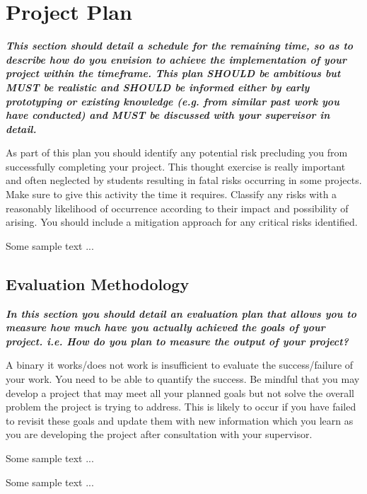 \documentclass{article} %
\newcommand{\hint}[1] {\par {\bfseries \color{Blue} \it #1 \par}}
\begin{document}
\newpage
\section{Project Plan}
\hint{This section should detail a schedule for the remaining time, so as to describe how do you envision to achieve the implementation of your project within the timeframe. This plan SHOULD be ambitious but MUST be realistic and SHOULD be informed either by early prototyping or existing knowledge (e.g. from similar past work you have conducted) and MUST be discussed with your supervisor in detail.

As part of this plan you should identify any potential risk precluding you from successfully completing your project. This thought exercise is really important and often neglected by students resulting in fatal risks occurring in some projects. Make sure to give this activity the time it requires. Classify any risks with a reasonably likelihood of occurrence according to their impact and possibility of arising. You should include a mitigation approach for any critical risks identified.

}

Some sample text ...

\subsection{Evaluation Methodology}
\hint{In this section you should detail an evaluation plan that allows you to measure how much have you actually achieved the goals of your project. i.e. How do you plan to measure the output of your project? 

A binary it works/does not work is insufficient to evaluate the success/failure of your work. You need to be able to quantify the success. Be mindful that you may develop a project that may meet all your planned goals but not solve the overall problem the project is trying to address. This is likely to occur if you have failed to revisit these goals and update them with new information which you learn as you are developing the project after consultation with your supervisor.

}
Some sample text ...

Some sample text ...
\end{document}
